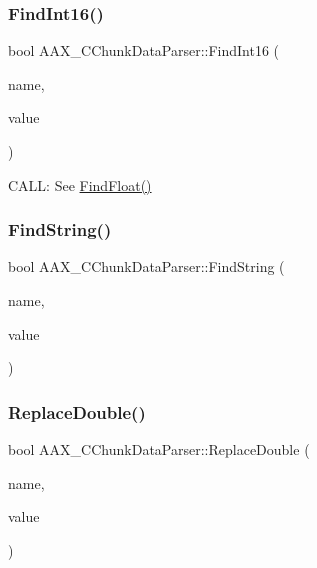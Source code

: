\mbox{\label{a01461_aaa004cdaafabb16caf7c0bad7e71db8f}} 
\subsubsection{\texorpdfstring{FindInt16()}{FindInt16()}}
{\footnotesize\ttfamily bool A\+A\+X\+\_\+\+C\+Chunk\+Data\+Parser\+::\+Find\+Int16 (\begin{DoxyParamCaption}\item[{const char $\ast$}]{name,  }\item[{int16\+\_\+t $\ast$}]{value }\end{DoxyParamCaption})}



C\+A\+LL\+: See \mbox{\hyperlink{a01461_a0651792f378318532e5be3799b108e58}{Find\+Float()}} 

\mbox{\label{a01461_a4272b40bb46bb54c0083d7313b3d73f7}} 
\subsubsection{\texorpdfstring{FindString()}{FindString()}}
{\footnotesize\ttfamily bool A\+A\+X\+\_\+\+C\+Chunk\+Data\+Parser\+::\+Find\+String (\begin{DoxyParamCaption}\item[{const char $\ast$}]{name,  }\item[{\mbox{\hyperlink{a01573}{A\+A\+X\+\_\+\+C\+String}} $\ast$}]{value }\end{DoxyParamCaption})}

\mbox{\label{a01461_af394b04f20c198396c4a4090bdeff06c}} 
\subsubsection{\texorpdfstring{ReplaceDouble()}{ReplaceDouble()}}
{\footnotesize\ttfamily bool A\+A\+X\+\_\+\+C\+Chunk\+Data\+Parser\+::\+Replace\+Double (\begin{DoxyParamCaption}\item[{const char $\ast$}]{name,  }\item[{double}]{value }\end{DoxyParamCaption})}

